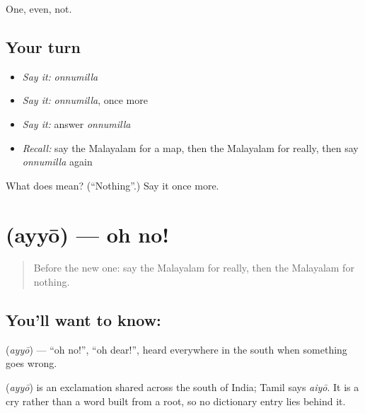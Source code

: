 \begin{grammarlens}[title={What you've built}]
One, even, not.
\end{grammarlens}

\subsection*{Your turn}
\begin{itemize}
\raggedright
  \item \emph{Say it:} \emph{onnumilla}
  \item \emph{Say it:} \emph{onnumilla}, once more
  \item \emph{Say it:} answer \emph{onnumilla}
  \item \emph{Recall:} say the Malayalam for a map, then the Malayalam for really, then say \emph{onnumilla} again
\end{itemize}

\begin{tcolorbox}[breakable,colback=teal!4,colframe=teal!35!black,title={Before you move on}]
What does  mean? (\textquotedblleft{}Nothing\textquotedblright{}.) Say it once more.
\end{tcolorbox}
\section[\texorpdfstring{\ml{അയ്യോ} (ayyō)}{അയ്യോ (ayyō)}]{ (ayyō) — oh no!}

\label{lesson:ML-C122-ohno}



\begin{quote}
Before the new one: say the Malayalam for really, then the Malayalam for nothing.
\end{quote}

\subsection*{You'll want to know: }
\textbf{} (\emph{ayyō}) — \textquotedblleft{}oh no!\textquotedblright{}, \textquotedblleft{}oh dear!\textquotedblright{}, heard everywhere in the south when something goes wrong.

\begin{cousinweb}
\textbf{} (\emph{ayyō}) is an exclamation shared across the south of India; Tamil says \emph{aiyō}. It is a cry rather than a word built from a root, so no dictionary entry lies behind it.
\end{cousinweb}

